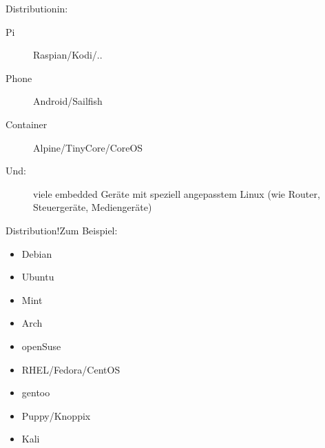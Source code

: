 \begin{frame}{Distribution}{in:}

 \begin{description}
  \item [Pi] Raspian/Kodi/..
  \item [Phone] Android/Sailfish
  \item [Container] Alpine/TinyCore/CoreOS
  \item [Und:] viele embedded Geräte mit speziell angepasstem Linux
 (wie Router, Steuergeräte, Mediengeräte)
 \end{description}

\end{frame}



\begin{frame}{Distribution!}{Zum Beispiel:}
\begin{itemize}%
\item Debian
\item Ubuntu
\item Mint
\item Arch
\item openSuse
\item RHEL/Fedora/CentOS 
\item gentoo
\item Puppy/Knoppix 
\item Kali 

\end{itemize}
\end{frame}

